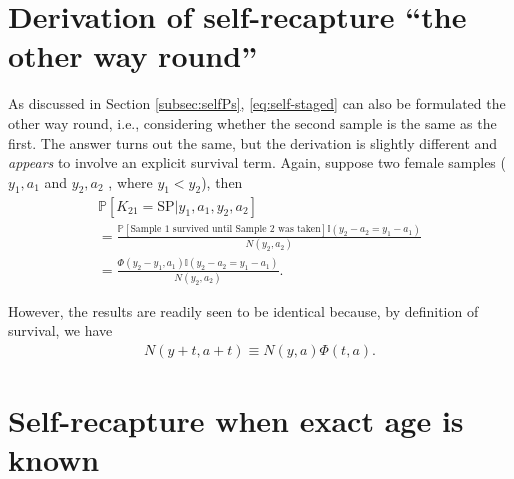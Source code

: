\setcounter{section}{0}
\renewcommand{\thesection}{\Alph{section}}

\section{Derivation of self-recapture ``the other way round''}

As discussed in Section \ref{subsec:selfPs}, \eqref{eq:self-staged}
can also be formulated \textquotedbl the other way round\textquotedbl ,
i.e., considering whether the second sample is the same as the first.
The answer turns out the same, but the derivation is slightly different
and \emph{appears} to involve an explicit survival term. Again, suppose
two female samples ($y_{1},a_{1}$ and $y_{2},a_{2}$ , where $y_{1}<y_{2}$),
then 
\begin{gather*}
\mathbb{P}\left[K_{21}=\text{SP}\vert y_{1},a_{1},y_{2},a_{2}\right]\\
=\frac{\mathbb{P}\left[\text{Sample 1 survived until Sample 2 was taken}\right]\mathbb{I}\left(y_{2}-a_{2}=y_{1}-a_{1}\right)}{N\left(y_{2},a_{2}\right)}\\
=\frac{\Phi\left(y_{2}-y_{1},a_{1}\right)\mathbb{I}\left(y_{2}-a_{2}=y_{1}-a_{1}\right)}{N\left(y_{2},a_{2}\right)}.
\end{gather*}

However, the results are readily seen to be identical because, by
definition of \textquotedbl survival\textquotedbl , we have
\begin{gather}
N\left(y+t,a+t\right)\equiv N\left(y,a\right)\Phi\left(t,a\right).\label{eq:cons-of-nums}
\end{gather}

\pagebreak{}

\section{Self-recapture when exact age is known\label{subsec:selfP-exact-age}}

